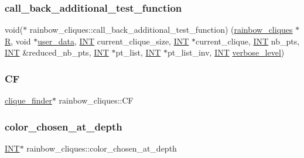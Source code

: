\subsubsection{\texorpdfstring{call\+\_\+back\+\_\+additional\+\_\+test\+\_\+function}{call\_back\_additional\_test\_function}}
{\footnotesize\ttfamily void($\ast$ rainbow\+\_\+cliques\+::call\+\_\+back\+\_\+additional\+\_\+test\+\_\+function) (\mbox{\hyperlink{classrainbow__cliques}{rainbow\+\_\+cliques}} $\ast$\mbox{\hyperlink{pentomino__5x5_8_c_a9e6c5a8291295bd0292db81cc90cb2cf}{R}}, void $\ast$\mbox{\hyperlink{classrainbow__cliques_a97f8b8a5deca9becc327c69640f66ecc}{user\+\_\+data}}, \mbox{\hyperlink{galois_8h_a09fddde158a3a20bd2dcadb609de11dc}{I\+NT}} current\+\_\+clique\+\_\+size, \mbox{\hyperlink{galois_8h_a09fddde158a3a20bd2dcadb609de11dc}{I\+NT}} $\ast$current\+\_\+clique, \mbox{\hyperlink{galois_8h_a09fddde158a3a20bd2dcadb609de11dc}{I\+NT}} nb\+\_\+pts, \mbox{\hyperlink{galois_8h_a09fddde158a3a20bd2dcadb609de11dc}{I\+NT}} \&reduced\+\_\+nb\+\_\+pts, \mbox{\hyperlink{galois_8h_a09fddde158a3a20bd2dcadb609de11dc}{I\+NT}} $\ast$pt\+\_\+list, \mbox{\hyperlink{galois_8h_a09fddde158a3a20bd2dcadb609de11dc}{I\+NT}} $\ast$pt\+\_\+list\+\_\+inv, \mbox{\hyperlink{galois_8h_a09fddde158a3a20bd2dcadb609de11dc}{I\+NT}} \mbox{\hyperlink{simeon_8_c_a818073fbcc2f439e7c56952f67386122}{verbose\+\_\+level}})}

\mbox{\label{classrainbow__cliques_a0c492e1c1a81606e92a40e6172221663}} 
\subsubsection{\texorpdfstring{CF}{CF}}
{\footnotesize\ttfamily \mbox{\hyperlink{classclique__finder}{clique\+\_\+finder}}$\ast$ rainbow\+\_\+cliques\+::\+CF}

\mbox{\label{classrainbow__cliques_ad5f45258d50fbefcf6fdfd4b5ceb2bc4}} 
\subsubsection{\texorpdfstring{color\+\_\+chosen\+\_\+at\+\_\+depth}{color\_chosen\_at\_depth}}
{\footnotesize\ttfamily \mbox{\hyperlink{galois_8h_a09fddde158a3a20bd2dcadb609de11dc}{I\+NT}}$\ast$ rainbow\+\_\+cliques\+::color\+\_\+chosen\+\_\+at\+\_\+depth}

